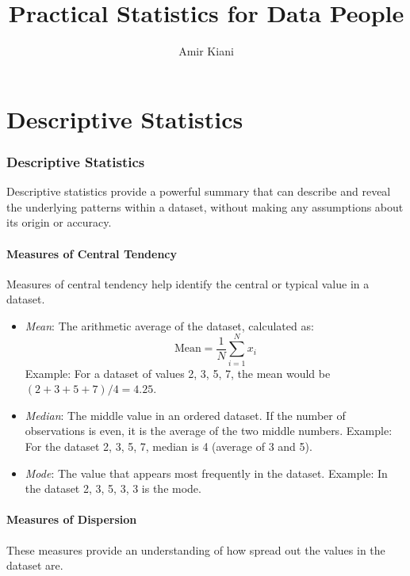 \documentclass{article}
\title{Practical Statistics for Data People}
\author{Amir Kiani}
\theoremstyle{definition}
\theoremstyle{theorem}
\theoremstyle{theorem}
\theoremstyle{theorem}
\theoremstyle{theorem}
\theoremstyle{definition}
\theoremstyle{definition}
\theoremstyle{definition}
\theoremstyle{definition}
\theoremstyle{definition}
\begin{document}
\maketitle

\tableofcontents
\newpage

\part{Descriptive Statistics}

\section{Descriptive Statistics}

Descriptive statistics provide a powerful summary that can describe and reveal the underlying patterns within a dataset, without making any assumptions about its origin or accuracy.

\subsection{Measures of Central Tendency}

Measures of central tendency help identify the central or typical value in a dataset.

\begin{itemize}
    \item \textit{Mean}: The arithmetic average of the dataset, calculated as:
    \[
    \text{Mean} = \frac{1}{N} \sum_{i=1}^{N} x_i
    \]
    Example: For a dataset of values 2, 3, 5, 7, the mean would be \((2+3+5+7)/4 = 4.25\).

    \item \textit{Median}: The middle value in an ordered dataset. If the number of observations is even, it is the average of the two middle numbers.
    Example: For the dataset 2, 3, 5, 7, median is 4 (average of 3 and 5).

    \item \textit{Mode}: The value that appears most frequently in the dataset.
    Example: In the dataset 2, 3, 5, 3, 3 is the mode.
\end{itemize}

\subsection{Measures of Dispersion}

These measures provide an understanding of how spread out the values in the dataset are.
\end{document}
